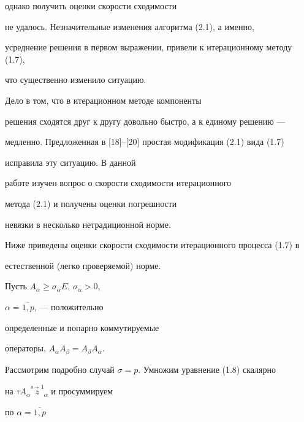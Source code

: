 однако получить оценки скорости сходимости 


не удалось. Незначительные изменения алгоритма (2.1), а именно,


усреднение решения в первом выражении, привели к итерационному методу (1.7),


что существенно изменило ситуацию. 


Дело в том, что в итерационном методе компоненты 


решения сходятся друг к другу довольно быстро, а к единому решению ---


медленно. Предложенная в [18]--[20] простая модификация (2.1) вида (1.7)


исправила эту ситуацию. В данной 


работе изучен вопрос о скорости сходимости итерационного


метода (2.1) и получены оценки погрешности 


невязки в несколько нетрадиционной норме.


Ниже приведены оценки скорости сходимости итерационного процесса (1.7) в 


естественной (легко проверяемой) норме.





Пусть $A_\alpha \ge{\sigma}_\alpha E$, $\sigma_\alpha>0$,


$\alpha=\overline {1,p}$, --- положительно 


определенные и попарно коммутируемые 


операторы, $A_\alpha A_\beta=A_\beta A_\alpha$.


Рассмотрим подробно случай $\sigma=p$. Умножим уравнение (1.8) скалярно


на $\tau A_\alpha \overset{s+1}{z}_{\!\!\!\alpha}$ и просуммируем


по $\alpha=\overline {1,p}$


